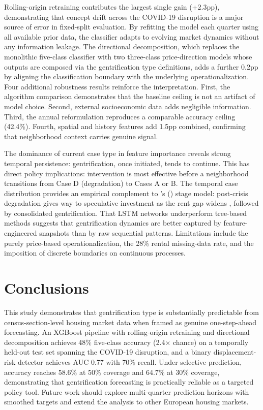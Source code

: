 \documentclass[12pt,a4paper]{article}
\begin{document}
Rolling-origin retraining contributes the largest single gain (+2.3pp), demonstrating that concept drift across the COVID-19 disruption is a major source of error in fixed-split evaluation. By refitting the model each quarter using all available prior data, the classifier adapts to evolving market dynamics without any information leakage. The directional decomposition, which replaces the monolithic five-class classifier with two three-class price-direction models whose outputs are composed via the gentrification type definitions, adds a further 0.2pp by aligning the classification boundary with the underlying operationalization. Four additional robustness results reinforce the interpretation. First, the algorithm comparison demonstrates that the baseline ceiling is not an artifact of model choice. Second, external socioeconomic data adds negligible information. Third, the annual reformulation reproduces a comparable accuracy ceiling (42.4\%). Fourth, spatial and history features add 1.5pp combined, confirming that neighborhood context carries genuine signal.

The dominance of current case type in feature importance reveals strong temporal persistence: gentrification, once initiated, tends to continue. This has direct policy implications: intervention is most effective before a neighborhood transitions from Case D (degradation) to Cases A or B. The temporal case distribution provides an empirical complement to \citeauthor{hackworth2001changing}'s (\citeyear{hackworth2001changing}) stage model: post-crisis degradation gives way to speculative investment as the rent gap widens \citep{smith2005rent}, followed by consolidated gentrification. That LSTM networks underperform tree-based methods suggests that gentrification dynamics are better captured by feature-engineered snapshots than by raw sequential patterns. Limitations include the purely price-based operationalization, the 28\% rental missing-data rate, and the imposition of discrete boundaries on continuous processes.

\section{Conclusions}

This study demonstrates that gentrification type is substantially predictable from census-section-level housing market data when framed as genuine one-step-ahead forecasting. An XGBoost pipeline with rolling-origin retraining and directional decomposition achieves 48\% five-class accuracy (2.4$\times$ chance) on a temporally held-out test set spanning the COVID-19 disruption, and a binary displacement-risk detector achieves AUC 0.77 with 70\% recall. Under selective prediction, accuracy reaches 58.6\% at 50\% coverage and 64.7\% at 30\% coverage, demonstrating that gentrification forecasting is practically reliable as a targeted policy tool. Future work should explore multi-quarter prediction horizons with smoothed targets and extend the analysis to other European housing markets.

{\small}
\end{document}

